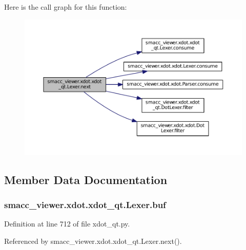 Here is the call graph for this function\+:
\nopagebreak
\begin{figure}[H]
\begin{center}
\leavevmode
\includegraphics[width=350pt]{classsmacc__viewer_1_1xdot_1_1xdot__qt_1_1Lexer_aa2b5bcafeb77f508d679e7c81e3b58ca_cgraph}
\end{center}
\end{figure}




\subsection{Member Data Documentation}
\subsubsection[{\texorpdfstring{buf}{buf}}]{\setlength{\rightskip}{0pt plus 5cm}smacc\+\_\+viewer.\+xdot.\+xdot\+\_\+qt.\+Lexer.\+buf}\hypertarget{classsmacc__viewer_1_1xdot_1_1xdot__qt_1_1Lexer_a84972711cf93f6cb82650f9f268198bf}{}\label{classsmacc__viewer_1_1xdot_1_1xdot__qt_1_1Lexer_a84972711cf93f6cb82650f9f268198bf}


Definition at line 712 of file xdot\+\_\+qt.\+py.



Referenced by smacc\+\_\+viewer.\+xdot.\+xdot\+\_\+qt.\+Lexer.\+next().


